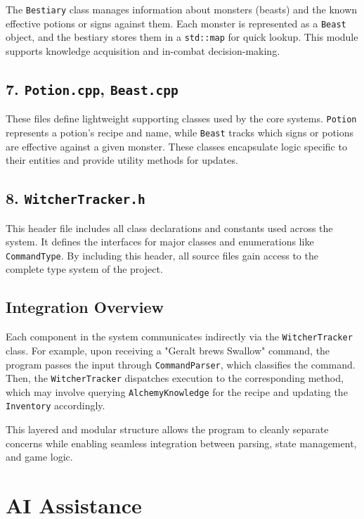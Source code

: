 \documentclass{article}
\begin{document}
The \texttt{Bestiary} class manages information about monsters (beasts) and the known effective potions or signs against them. Each monster is represented as a \texttt{Beast} object, and the bestiary stores them in a \texttt{std::map} for quick lookup. This module supports knowledge acquisition and in-combat decision-making.

\subsection*{7. \texttt{Potion.cpp}, \texttt{Beast.cpp}}

These files define lightweight supporting classes used by the core systems. \texttt{Potion} represents a potion's recipe and name, while \texttt{Beast} tracks which signs or potions are effective against a given monster. These classes encapsulate logic specific to their entities and provide utility methods for updates.

\subsection*{8. \texttt{WitcherTracker.h}}

This header file includes all class declarations and constants used across the system. It defines the interfaces for major classes and enumerations like \texttt{CommandType}. By including this header, all source files gain access to the complete type system of the project.

\subsection*{Integration Overview}

Each component in the system communicates indirectly via the \texttt{WitcherTracker} class. For example, upon receiving a "Geralt brews Swallow" command, the program passes the input through \texttt{CommandParser}, which classifies the command. Then, the \texttt{WitcherTracker} dispatches execution to the corresponding method, which may involve querying \texttt{AlchemyKnowledge} for the recipe and updating the \texttt{Inventory} accordingly.

This layered and modular structure allows the program to cleanly separate concerns while enabling seamless integration between parsing, state management, and game logic.

\section{AI Assistance}
\end{document}
